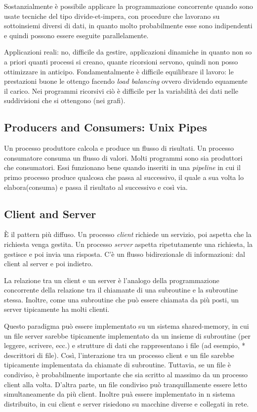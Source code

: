\documentclass[10pt,a4paper]{book}
\begin{document}
Sostanzialmente è possibile applicare la programmazione concorrente quando sono usate tecniche del tipo divide-et-impera, con procedure che lavorano su sottoinsiemi diversi di dati, in quanto molto probabilmente esse sono indipendenti e quindi possono essere eseguite parallelamente.

Applicazioni reali: no, difficile da gestire, applicazioni dinamiche in quanto non so a priori quanti processi si creano, quante ricorsioni servono, quindi non posso ottimizzare in anticipo.
Fondamentalmente è difficile equilibrare il lavoro: le prestazioni buone le ottengo facendo \textit{load balancing} ovvero dividendo equamente il carico. Nei programmi ricorsivi ciò è difficile per la variabilità dei dati nelle suddivisioni che si ottengono (nei grafi).

\subsection{Producers and Consumers: Unix Pipes}
Un processo produttore calcola e produce un flusso di risultati. Un processo consumatore consuma un flusso di valori. Molti programmi sono sia produttori che consumatori. Essi funzionano bene quando inseriti in una \textit{pipeline} in cui il primo processo produce qualcosa che passa al successivo, il quale a sua volta lo elabora(consuma) e passa il risultato al successivo e così via.


\subsection{Client and Server}
\`{E} il pattern più diffuso. Un processo \textit{client} richiede un servizio, poi aspetta che la richiesta venga gestita. Un processo \textit{server} aspetta ripetutamente una richiesta, la gestisce e poi invia una risposta. C'è un flusso bidirezionale di informazioni: dal client al server e poi indietro.

La relazione tra un client e un server è l'analogo della programmazione concorrente della relazione tra il chiamante di una subroutine e la subroutine stessa. Inoltre, come una subroutine che può essere chiamata da più posti, un server tipicamente ha molti clienti.

Questo paradigma può essere implementato su un sistema shared-memory, in cui un file server sarebbe tipicamente implementato da un insieme di subroutine (per leggere, scrivere, ecc.) e strutture di dati che rappresentano i file (ad esempio, * descrittori di file). Così, l'interazione tra un processo client e un file sarebbe tipicamente implementata da chiamate di subroutine. Tuttavia, se un file è condiviso, è probabilmente importante che sia scritto al massimo da un processo client alla volta. D'altra parte, un file condiviso può tranquillamente essere letto simultaneamente da più client.
Inoltre puà essere implementato in n sistema distribuito, in cui client e server risiedono su macchine diverse e collegati in rete.
\end{document}
